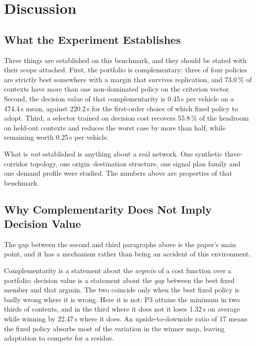 \documentclass[preprint,12pt]{elsarticle}
\begin{document}
\section{Discussion}
\label{sec:discussion}

\subsection{What the Experiment Establishes}
\label{sec:disc:what}

Three things are established on this benchmark, and they should be stated with
their scope attached. First, the portfolio is complementary: three of four
policies are strictly best somewhere with a margin that survives replication, and
73.0\,\% of contexts have more than one non-dominated policy on the criterion
vector. Second, the decision value of that complementarity is 0.45\,s per vehicle
on a 474.4\,s mean, against 220.2\,s for the first-order choice of which fixed
policy to adopt. Third, a selector trained on decision cost recovers 55.8\,\% of
the headroom on held-out contexts and reduces the worst case by more than half,
while remaining worth 0.25\,s per vehicle.

What is \emph{not} established is anything about a real network. One synthetic
three-corridor topology, one origin--destination structure, one signal plan
family and one demand profile were studied. The numbers above are properties of
that benchmark.

\subsection{Why Complementarity Does Not Imply Decision Value}
\label{sec:disc:gap}

The gap between the second and third paragraphs above is the paper's main point,
and it has a mechanism rather than being an accident of this environment.

Complementarity is a statement about the \emph{argmin} of a cost function over a
portfolio; decision value is a statement about the \emph{gap} between the best
fixed member and that argmin. The two coincide only when the best fixed policy is
badly wrong where it is wrong. Here it is not: P3 attains the minimum in two
thirds of contexts, and in the third where it does not it loses 1.32\,s on average
while winning by 22.47\,s where it does. An upside-to-downside ratio of 17 means
the fixed policy absorbs most of the variation in the winner map, leaving
adaptation to compete for a residue.
\end{document}
